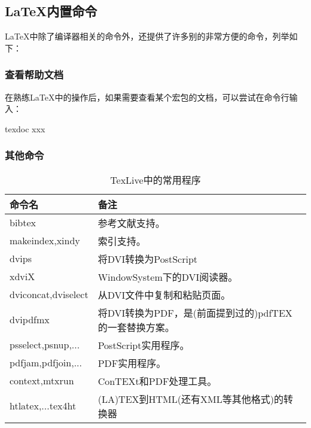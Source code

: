 \subsection{\LaTeX{}内置命令}
    \LaTeX{}中除了编译器相关的命令外，还提供了许多别的非常方便的命令，列举如下：
    \subsubsection{查看帮助文档}
    在熟练\LaTeX{}中的操作后，如果需要查看某个宏包的文档，可以尝试在命令行输入：
    \begin{languagebox}[bash]
        texdoc xxx
    \end{languagebox}
    
    \subsubsection{其他命令}
    \begin{center}
        \setlength\tablewidth{\dimexpr (\textwidth -4\tabcolsep)}
        \begin{table}[H]
            \begin{tabular}{|p{0.50\tablewidth}<{\centering}|p{0.50\tablewidth}<{\centering}|}
                \hline
                命令名&备注\\
                \hline
                bibtex&参考文献支持。\\
                \hline
                makeindex,xindy&索引支持。\\
                \hline
                dvips&将DVI转换为PostScript\\
                \hline
                xdviX&WindowSystem下的DVI阅读器。\\
                \hline
                dviconcat,dviselect&从DVI文件中复制和粘贴页面。\\
                \hline
                dvipdfmx&将DVI转换为PDF，是(前面提到过的)pdfTEX的一套替换方案。\\
                \hline
                psselect,psnup,...&PostScript实用程序。\\
                \hline
                pdfjam,pdfjoin,...&PDF实用程序。\\
                \hline
                context,mtxrun&ConTEXt和PDF处理工具。\\
                \hline
                htlatex,...tex4ht&(LA)TEX到HTML(还有XML等其他格式)的转换器\\
                \hline
            \end{tabular}
            \caption{TexLive中的常用程序}
        \end{table}
    \end{center}

